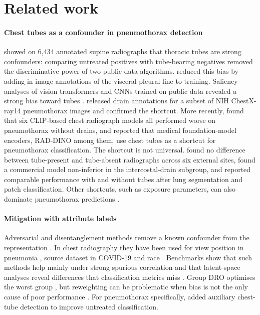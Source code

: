 \documentclass[final,3p]{elsarticle}
\begin{document}
\section{Related work}
\label{sec:related}

\paragraph{Chest tubes as a confounder in pneumothorax detection}
\citet{rueckel2020tubes} showed on 6{,}434 annotated supine radiographs that thoracic tubes are strong confounders: comparing untreated positives with tube-bearing negatives removed the discriminative power of two public-data algorithms. \citet{rueckel2021annotations} reduced this bias by adding in-image annotations of the visceral pleural line to training. Saliency analyses of vision transformers and CNNs trained on public data revealed a strong bias toward tubes \citep{wollek2023attention}. \citet{jimenez2023shortcuts} released drain annotations for a subset of NIH ChestX-ray14 pneumothorax images and confirmed the shortcut. More recently, \citet{sourget2025clip} found that six CLIP-based chest radiograph models all performed worse on pneumothorax without drains, and \citet{li2025featurequality} reported that medical foundation-model encoders, RAD-DINO among them, use chest tubes as a shortcut for pneumothorax classification. The shortcut is not universal. \citet{thian2021external} found no difference between tube-present and tube-absent radiographs across six external sites, \citet{seah2021hidden} found a commercial model non-inferior in the intercostal-drain subgroup, and \citet{graf2020tube} reported comparable performance with and without tubes after lung segmentation and patch classification. Other shortcuts, such as exposure parameters, can also dominate pneumothorax predictions \citep{shu2026exposure}.

\paragraph{Mitigation with attribute labels}
Adversarial and disentanglement methods remove a known confounder from the representation \citep{ganin2015dann,kim2019learning,zhao2020confounder}. In chest radiography they have been used for view position in pneumonia \citep{janizek2020adversarial}, source dataset in COVID-19 \citep{robinson2022disentangle} and race \citep{correa2023cav}. Benchmarks show that such methods help mainly under strong spurious correlation and that latent-space analyses reveal differences that classification metrics miss \citep{muller2026disentangle}. Group DRO optimises the worst group \citep{sagawa2020groupdro}, but reweighting can be problematic when bias is not the only cause of poor performance \citep{kumar2023droinvariant}. For pneumothorax specifically, \citet{bandaru2026untreated} added auxiliary chest-tube detection to improve untreated classification.
\end{document}
